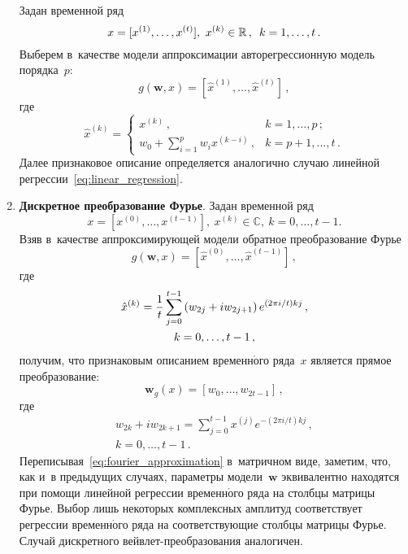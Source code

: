 \begin{multicols}{2}
\begin{enumerate}[1.]
Задан временной ряд
$$
x = [x^{(1)},\dots,x^{(t)}],\ x^{(k)}\in\mathbb{R}\,,\enskip k=1,\dots,t\,.
$$
Выберем в~качестве модели аппроксимации авторегрессионную модель порядка~$p$:
\begin{equation*}
g(\mathbf{w},x)=\left[\hat{x}^{(1)},\dots,\hat{x}^{(t)}\right]\,,
\label{eq:autoregressive_model}
\end{equation*}
где
\begin{equation*}
\hat{x}^{(k)}=
\begin{cases}
x^{(k)}\,, & k=1,\dots,p\,;\\
w_0 + \sum\limits_{i=1}^{p} w_i x^{(k-i)}\,, & k=p+1,\dots,t\,.
\end{cases}
\end{equation*}
Далее признаковое описание определяется аналогично случаю линейной 
регрессии~\eqref{eq:linear_regression}.

\item \textbf{Дискретное преобразование Фурье}.
Задан временной ряд
$$
x = \left[x^{(0)},\dots,x^{(t-1)}\right],\ x^{(k)}\in\mathbb{C},\ k=0,\dots,t-1.
$$
Взяв в~качестве аппроксимирующей модели обратное преобразование Фурье
$$
g(\mathbf{w},x)=\left[\hat{x}^{(0)},\dots,\hat{x}^{(t-1)}\right]\,,
$$
где
\begin{multline}
\label{eq:fourier_approximation}
\hat{x}^{(k)}=\displaystyle\frac{\displaystyle 1\mathstrut}{\displaystyle t\mathstrut}\sum\limits_{j=0}^{t-1} 
\left(w_{2j}+iw_{2j+1}\right) e^{({2\pi i}/t)kj}\,,\\ k=0,\dots,t-1\,,
\end{multline}
получим, что признаковым описанием вре\-мен\-н$\acute{\mbox{о}}$го ряда~$x$ является прямое преобразование:
\begin{equation}
\label{eq:fourier}
\mathbf{w}_g(x)=\left[w_0,\dots,w_{2t-1}\right]\,,
\end{equation}
где 
\begin{multline*}
w_{2k}+iw_{2k+1}=\sum\limits_{j=0}^{t-1} x^{(j)} 
e^{-({2\pi i}/{t})kj}\,,\\ k=0,\dots,t-1\,.
\end{multline*}
Переписывая~\eqref{eq:fourier_approximation} в~матричном виде, 
заметим, что, как и~в предыдущих случаях, параметры модели~$\mathbf{w}$ 
эквивалентно находятся при помощи линейной регрессии временн$\acute{\mbox{о}}$го 
ряда на столбцы матрицы Фурье.
Выбор лишь некоторых комплексных амплитуд соответствует регрессии временн$\acute{\mbox{о}}$го 
ряда на соответствующие столбцы матрицы Фурье.
Случай дискретного вейв\-лет-пре\-об\-ра\-зо\-ва\-ния аналогичен.
\end{enumerate}


\end{multicols}
